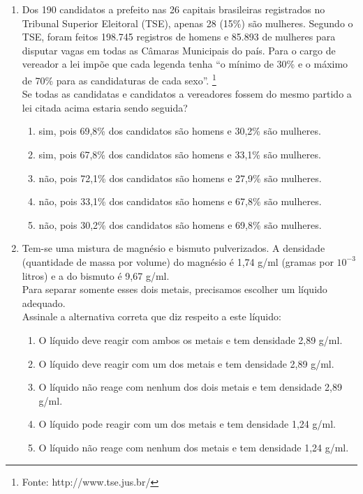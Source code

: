 \documentclass[10pt,a4paper]{article}
\begin{document}
\begin{multicols}{2}
\begin{enumerate}
	\item Dos 190 candidatos a prefeito nas 26 capitais brasileiras registrados no Tribunal Superior Eleitoral (TSE), apenas 28 (15\%) são mulheres. Segundo o TSE, foram feitos 198.745 registros de homens e 85.893 de mulheres para disputar vagas em todas as Câmaras Municipais do país. Para o cargo de vereador a lei impõe que cada legenda tenha “o mínimo de 30\% e o m\'aximo de 70\% para as candidaturas de cada sexo”. \footnote{Fonte: http://www.tse.jus.br/} \\
	Se todas as candidatas e candidatos a vereadores fossem do mesmo partido a lei citada acima estaria sendo seguida?

		\begin{enumerate}
		\item sim, pois 69,8\% dos candidatos são homens e 30,2\% são mulheres.
		\item sim, pois 67,8\% dos candidatos são homens e 33,1\% são mulheres.
		\item não, pois 72,1\% dos candidatos são homens e 27,9\% são mulheres.
		\item não, pois 33,1\% dos candidatos são homens e 67,8\% são mulheres.
		\item não, pois 30,2\% dos candidatos são homens e 69,8\% são mulheres.
		\end{enumerate}


	\item Tem-se uma mistura de magn\'esio e bismuto pulverizados. A densidade (quantidade de massa por volume) do magn\'esio \'e 1,74 g/ml (gramas por $10^{-3}$ litros) e a do bismuto \'e 9,67 g/ml. \\
	Para separar somente esses dois metais, precisamos escolher um líquido adequado. \\
	Assinale a alternativa correta que diz respeito a este líquido:
		\begin{enumerate}
		\item O líquido deve reagir com ambos os metais e tem densidade 2,89 g/ml.
		\item O líquido deve reagir com um dos metais e tem densidade 2,89 g/ml.
		\item O líquido não reage com nenhum dos dois metais e tem densidade 2,89 g/ml.
		\item O líquido pode reagir com um dos metais e tem densidade 1,24 g/ml.
		\item O líquido não reage com nenhum dos metais e tem densidade 1,24 g/ml.
		\end{enumerate}


\end{enumerate}
\end{multicols}
\end{document}
